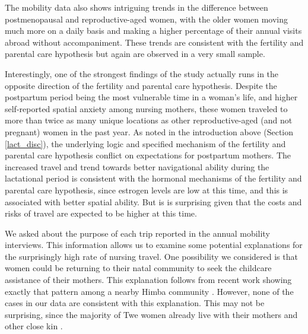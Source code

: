 The mobility data also shows intriguing trends in the difference between postmenopausal and reproductive-aged women, with the older women moving much more on a daily basis and making a higher percentage of their annual visits abroad without accompaniment.  These trends are consistent with the fertility and parental care hypothesis but again are observed in a very small sample.

Interestingly, one of the strongest findings of the study actually runs in the opposite direction of the fertility and parental care hypothesis.  Despite the postpartum period being the most vulnerable time in a woman's life, and higher self-reported spatial anxiety among nursing mothers, these women traveled to more than twice as many unique locations as other reproductive-aged (and not pregnant) women in the past year.  As noted in the introduction above (Section \ref{lact_disc}), the underlying logic and specified mechanism of the fertility and parental care hypothesis conflict on expectations for postpartum mothers.  The increased travel and trend towards better navigational ability during the lactational period is consistent with the hormonal mechanisms of the fertility and parental care hypothesis, since estrogen levels are low at this time, and this is associated with better spatial ability.  But is is surprising given that the costs and risks of travel are expected to be higher at this time.

We asked about the purpose of each trip reported in the annual mobility interviews.  This information allows us to examine some potential explanations for the surprisingly high rate of nursing travel.  One possibility we considered is that women could be returning to their natal community to seek the childcare assistance of their mothers.  This explanation follows from recent work showing exactly that pattern among a nearby Himba community  \citep{scelza2011female}.  However, none of the cases in our data are consistent with this explanation.  This may not be surprising, since the majority of Twe women already live with their mothers and other close kin \citep{vashro2014residence}.  

